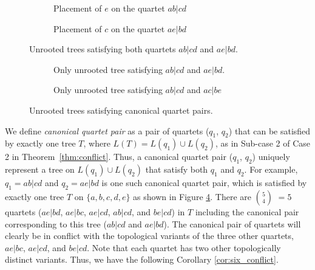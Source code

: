 \documentclass[10pt,a4paper]{article}
\newcommand{\addb}[1]{{\color{red} #1}}
\begin{document}
\begin{figure}[h]
    \centering
    \begin{subfigure}{0.45\textwidth}
        \centering
        \caption{Placement of $e$ on the quartet $ab|cd$}
        \label{fig:place_e_on_ab|cd}
    \end{subfigure}
    \hfill 
    \begin{subfigure}{0.45\textwidth}
        \centering
        \caption{Placement of $c$ on the quartet $ae|bd$}
        \label{fig:place_c_on_ae|bd}
    \end{subfigure}
    \caption{Unrooted trees satisfying both quartets $ab|cd$ and $ae|bd$.}
    \label{fig:comparison_e_and_c}
\end{figure}

\begin{figure}[h]
    \centering
    \begin{subfigure}{0.45\textwidth}
        \centering
        \caption{Only unrooted tree satisfying $ab|cd$ and $ae|bd$.}
        \label{fig:unrooted_tree_1}
    \end{subfigure}
    \hfill 
    \centering
    \begin{subfigure}{0.45\textwidth}
        \centering
        \caption{Only unrooted tree satisfying $ab|cd$ and $ac|be$}
        \label{fig:unrooted_tree_2}
    \end{subfigure}
    \caption{Unrooted trees satisfying canonical quartet pairs.}
 
\end{figure}






We define \textit{canonical quartet pair} as a pair of quartets ($q_1$, $q_2$) that can be satisfied by exactly one tree $T$, where $L(T) = L(q_1) \cup L(q_2)$, as in Sub-case 2 of Case 2 in Theorem~\ref{thm:conflict}. Thus, a canonical quartet pair ($q_1$, $q_2$) uniquely represent a tree on $L(q_1) \cup L(q_2)$ that satisfy both $q_1$ and $q_2$. For example, $q_1 = ab|cd$ and $q_2 = ae|bd$ %
is one such canonical quartet pair, which is satisfied by exactly one tree $T$ on $\{a,b,c,d,e\}$ as shown in Figure \ref{fig:unrooted_tree_1}. There are $5 \choose 4$ $=5$ quartets ($ae|bd$, $ae|bc$, $ae|cd$, $ab|cd$, and $be|cd$) in $T$ including the canonical pair corresponding to this tree ($ab|cd$ and $ae|bd$). The canonical pair of quartets will clearly be in conflict with the topological variants of the three other quartets, $ae|bc$, $ae|cd$, and $be|cd$. Note that each quartet has two other topologically distinct variants. Thus, we have the following Corollary \ref{cor:six_conflict}.
\end{document}
